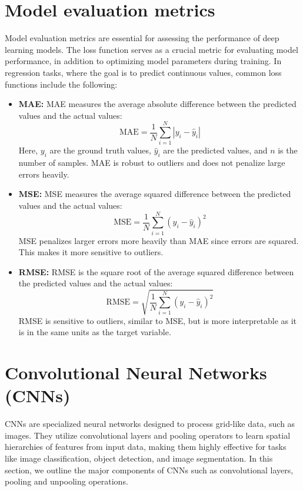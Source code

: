 \section{Model evaluation metrics}
Model evaluation metrics are essential for assessing the performance of deep learning models. The loss function serves as a crucial metric for evaluating model performance, in addition to optimizing model parameters during training. In regression tasks, where the goal is to predict continuous values, common loss functions include the following:
\begin{itemize}
\item \textbf{\gls{MAE}:} MAE measures the average absolute difference between the predicted values and the actual values:\[ \text{MAE} = \frac{1}{N} \sum_{i=1}^{N} |y_i - \hat{y}_i| \] Here, $y_i$ are the ground truth values, $\hat{y}_i$ are the predicted values, and $n$ is the number of samples. MAE is robust to outliers and does not penalize large errors heavily.
\item \textbf{\gls{MSE}:} MSE measures the average squared difference between the predicted values and the actual values:\[ \text{MSE} = \frac{1}{N} \sum_{i=1}^{N} (y_i - \hat{y}_i)^2 \] MSE penalizes larger errors more heavily than MAE since errors are squared. This makes it more sensitive to outliers. 
\item \textbf{\gls{RMSE}:} RMSE is the square root of the average squared difference between the predicted values and the actual values: \[ \text{RMSE} = \sqrt{\frac{1}{N} \sum_{i=1}^{N} (y_i - \hat{y}_i)^2} \]RMSE is sensitive to outliers, similar to MSE, but is more interpretable as it is in the same units as the target variable.
\end{itemize}
\section{Convolutional Neural Networks (CNNs)} \label{cnnse}
CNNs \cite{lecun1998} are specialized neural networks designed to process grid-like data, such as images. They utilize convolutional layers and pooling operators to learn spatial hierarchies of features from input data, making them highly effective for tasks like image classification, object detection, and image segmentation. In this section, we outline the major components of CNNs such as convolutional layers, pooling and unpooling operations. 
